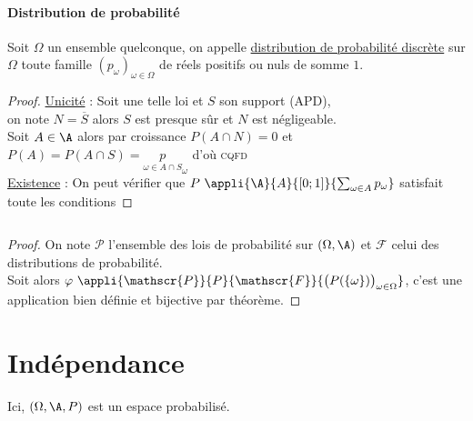 		\paragraph{Distribution de probabilité}
		Soit $\Omega$ un ensemble quelconque, on appelle \uline{distribution de probabilité discrète} sur $\Omega$ toute famille $(p_{\omega})_{\omega\in\Omega}$ de réels positifs ou nuls de somme $1$. \trait
		\begin{proof}
		\uline{Unicité} : Soit une telle loi et $S$ son support (APD), \\ on note $N=\overline{S}$ alors $S$ est presque sûr et $N$ est négligeable.\\
		Soit $A\in\A$ alors par croissance $P(A\cap N)=0$ et $P(A) = P(A\cap S) = \underset{\omega\in A\cap S} p_{\omega}$ d'où \textsc{cqfd} \\
		\uline{Existence} : On peut vérifier que $P~\appli{\A}{A}{[0;1]}{\sum_{\omega\in A} p_{\omega}}$ satisfait toute les conditions
		\end{proof}
		${}$ \\ 
		\begin{proof}
		On note $\mathscr{P}$ l'ensemble des lois de probabilité sur $(\Omega,\A)$ et $\mathscr{F}$ celui des distributions de probabilité.\\
		Soit alors $\varphi ~\appli{\mathscr{P}}{P}{\mathscr{F}}{\big( P(\{\omega\})\big)_{\omega\in\Omega}}$, c'est une application bien définie et bijective par théorème.
		\end{proof}
	\section{Indépendance}
		Ici, $(\Omega,\A,P)$ est un espace probabilisé.\\
		\traitd 
